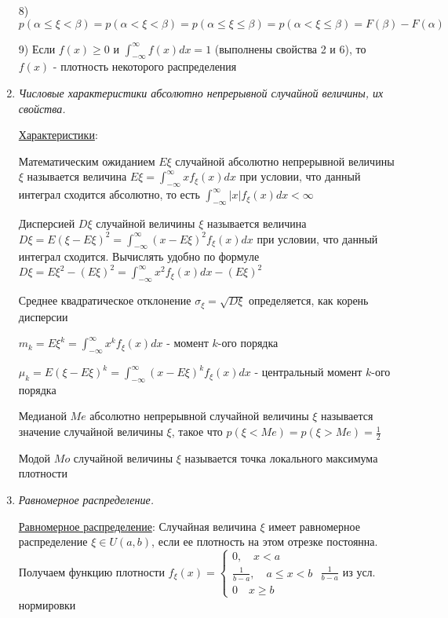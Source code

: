 \begin{enumerate}
    8) $p(\alpha \leq \xi < \beta) = p(\alpha < \xi < \beta) = p(\alpha \leq \xi \leq \beta) = p(\alpha < \xi \leq \beta) = F(\beta) - F(\alpha)$

    9) \Ths Если $f(x) \geq 0$ и $\int_{-\infty}^{\infty} f(x)dx = 1$ (выполнены свойства 2 и 6), то $f(x)$ - плотность некоторого распределения

    \item \textit{Числовые характеристики абсолютно непрерывной случайной величины, их свойства.}

    \hyperlink{attributesofcontinuousrandomvariable}{Характеристики}:

    Математическим ожиданием $E\xi$ случайной абсолютно непрерывной величины $\xi$ называется величина $E\xi = \int_{-\infty}^{\infty} xf_\xi(x) dx$ 
    при условии, что данный интеграл сходится абсолютно, то есть $\int_{-\infty}^\infty |x|f_\xi(x)dx < \infty$

    Дисперсией $D\xi$ случайной величины $\xi$ называется величина $D\xi = E(\xi - E\xi)^2 = \int_{-\infty}^\infty (x - E\xi)^2 f_\xi(x) dx$ при условии,
    что данный интеграл сходится. Вычислять удобно по формуле $D\xi = E\xi^2 - (E\xi)^2 = \int_{-\infty}^\infty x^2 f_\xi(x)dx - (E\xi)^2$

    Среднее квадратическое отклонение $\sigma_\xi = \sqrt{D\xi}$ определяется, как корень дисперсии

    $m_k = E\xi^k = \int_{-\infty}^\infty x^k f_\xi(x)dx$ - момент $k$-ого порядка

    $\mu_k = E(\xi - E\xi)^k = \int_{-\infty}^\infty (x - E\xi)^k f_\xi(x)dx$ - центральный момент $k$-ого порядка
    
    Медианой $Me$ абсолютно непрерывной случайной величины $\xi$ называется значение случайной величины $\xi$, такое что $p(\xi < Me) = p(\xi > Me) = \frac{1}{2}$
    
    Модой $Mo$ случайной величины $\xi$ называется точка локального максимума плотности

    \item \textit{Равномерное распределение. }

    \hyperlink{uniformdistribution}{Равномерное распределение}: Случайная величина $\xi$ имеет равномерное распределение $\xi \in U(a, b)$, если ее плотность
    на этом отрезке постоянна. Получаем функцию плотности $f_\xi(x) = \begin{cases}0, \quad x < a \\ \frac{1}{b - a}, \quad a \leq x < b \\ 0 \quad x \geq b\end{cases}$ \hfill {\scriptsize $\frac{1}{b - a}$ из усл. нормировки}


\end{enumerate}

